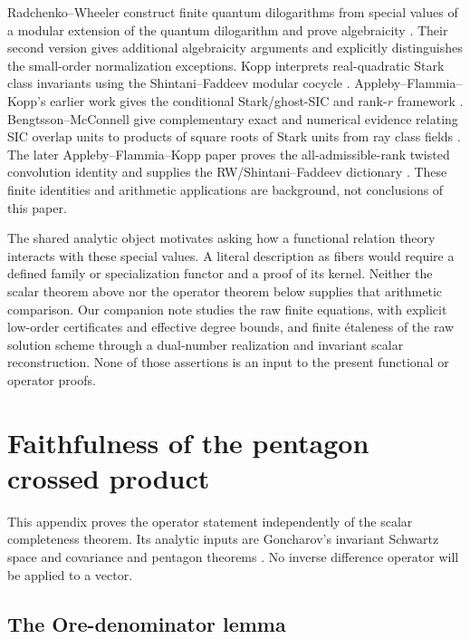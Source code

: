 \documentclass[11pt]{article}
\numberwithin{equation}{section}
\theoremstyle{definition}
\theoremstyle{remark}
\begin{document}
Radchenko--Wheeler construct finite quantum dilogarithms from special values
of a modular extension of the quantum dilogarithm and prove algebraicity
\cite{RadchenkoWheeler2026}. Their second version gives additional algebraicity
arguments and explicitly distinguishes the small-order normalization exceptions.
Kopp interprets real-quadratic Stark class invariants using the
Shintani--Faddeev modular cocycle \cite{Kopp2024}.
Appleby--Flammia--Kopp's earlier work gives the conditional Stark/ghost-SIC
and rank-$r$ framework \cite{AFK2025}. Bengtsson--McConnell give complementary
exact and numerical evidence relating SIC overlap units to products of square
roots of Stark units from ray class fields \cite{BengtssonMcConnell2026}.
The later Appleby--Flammia--Kopp paper proves the all-admissible-rank twisted
convolution identity and supplies the RW/Shintani--Faddeev dictionary
\cite[Theorem~1.3 and Proposition~2.1]{ApplebyFlammiaKopp2026}. These finite
identities and arithmetic applications are background, not conclusions of
this paper.

The shared analytic object motivates asking how a functional relation theory
interacts with these special values. A literal description as fibers would
require a defined family or specialization functor and a proof of its kernel.
Neither the scalar theorem above nor the operator theorem below supplies
that arithmetic comparison. Our companion note \cite{LongFinite2026}
studies the raw finite equations, with explicit low-order certificates and
effective degree bounds, and finite \'{e}taleness of the raw solution scheme
through a dual-number realization and invariant scalar reconstruction. None of those assertions is an input
to the present functional or operator proofs.

\appendix
\section{Faithfulness of the pentagon crossed product}\label{app:operator}

This appendix proves the operator statement independently of the scalar
completeness theorem. Its analytic inputs are Goncharov's invariant Schwartz
space and covariance and pentagon theorems \cite[Theorems~1.1, 2.3,
2.6]{Goncharov2007}. No inverse difference operator will be applied to a
vector.

\subsection{The Ore-denominator lemma}
\end{document}
